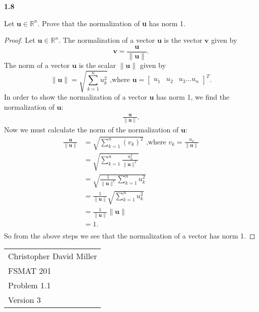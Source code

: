 \documentclass[12pt]{article}
\begin{document}
\textbf{1.8} \\  %
\begin{prop}
Let $\mathbf{u} \in \mathbb{R}^n$. Prove that the normalization of \textbf{u} has norm 1.
\end{prop}
\begin{proof}
    Let $\mathbf{u} \in \mathbb{R}^n$.
    The normalization of a vector $\mathbf{u}$ is the vector $\mathbf{v}$ given by   
    \[\mathbf{v} = \frac{\mathbf{u}}{\| \mathbf{u} \|}.\] 
    The norm of a vector $\mathbf{u}$ is the scalar $\|  \mathbf{u} \|$ given by   
    $$\|  \mathbf{u} \| = \sqrt{\sum_{k=1}^{n}u_k^2} \text{ ,where } \mathbf{u} = \begin{bmatrix}u_1  &u_2& u_3 \dots u_n
       \end{bmatrix}^{T}.  $$ 
    In order to show the normalization of a vector $\mathbf{u}$ has norm 1, we find the normalization of $\mathbf{u}$:
       \begin{align*}
         \frac{\mathbf{u}}{\| \mathbf{u} \|}.
       \end{align*}
       Now we must calculate the norm of the normalization of $\mathbf{u}$:
        \begin{align*}
            \frac{\mathbf{u}}{\| \mathbf{u} \|} &=  \sqrt{\sum_{k=1}^{n}\left(v_k\right)^2} \text{ ,where   } v_k =\frac{u_k}{\| \mathbf{u} \|} \\ 
                            &=  \sqrt{\sum_{k=1}^{n}\frac{u_k^2}{\| \mathbf{u} \|^2}} \\ 
                            &=  \sqrt{\frac{1}{\| \mathbf{u} \|^2}\sum_{k=1}^{n} u_k^2} \\
                            &=  \frac{1}{\| \mathbf{u} \|}\sqrt{\sum_{k=1}^{n} u_k^2} \\
                            &=  \frac{1}{\| \mathbf{u} \|} \| \mathbf{u} \| \\
                            &=  1. \\
        \end{align*}
        So from the above steps we see that the normalization of a vector has norm 1.  
\end{proof}
\newpage
\begin{flushright}
    \begin{tabular}{l}
    Christopher David Miller \\  %
    FSMAT 201 \\  %
    Problem 1.1 \\  %
    Version 3 \\ %
    \end{tabular}
    \end{flushright}
    \vspace{20pt}  %
    
\end{document}
